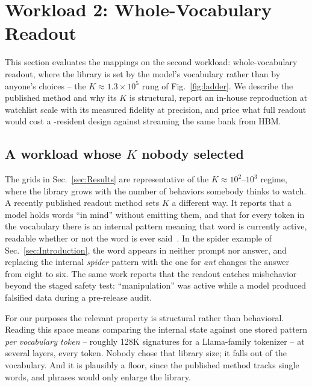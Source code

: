 \section{Workload 2: Whole-Vocabulary Readout}
\label{sec:LargeK}

This section evaluates the mappings on the second workload:
whole-vocabulary readout, where the library is set by the model's
vocabulary rather than by anyone's choices -- the
$K\approx1.3\times10^{5}$ rung of Fig.~\ref{fig:ladder}. We describe
the published method and why its $K$ is structural, report an
in-house reproduction at watchlist scale with its measured fidelity
at \cam precision, and price what full readout would cost a
\cam-resident design against streaming the same bank from HBM.

\subsection{A workload whose $K$ nobody selected}
\label{subsec:Jspace}
The grids in Sec.~\ref{sec:Results} are representative of the
$K\approx10^{2}$--$10^{3}$ regime, where the library grows with the
number of behaviors somebody thinks to watch. A recently published
readout method sets $K$ a different way. It reports that a model holds words ``in
mind'' without emitting them, and that for every token in the vocabulary
there is an internal pattern meaning that word is currently active,
readable whether or not the word is ever
said~\cite{anthropic2026workspace}. In the spider example of
Sec.~\ref{sec:Introduction}, the word appears in neither prompt nor
answer, and replacing the internal \emph{spider} pattern with the one
for \emph{ant} changes the answer from eight to six. The same work
reports that the readout catches misbehavior beyond the staged safety
test: ``manipulation'' was active while a model produced falsified
data during a pre-release audit.

For our purposes the relevant property is structural rather than
behavioral. Reading this space means comparing the internal state against
one stored pattern \emph{per vocabulary token} -- roughly 128K signatures
for a Llama-family tokenizer -- at several layers, every token. Nobody
chose that library size; it falls out of the vocabulary. And it is
plausibly a floor, since the published method tracks single words, and
phrases would only enlarge the library.


